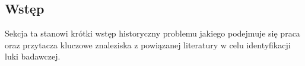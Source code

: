 \subsection{Wstęp}

Sekcja ta stanowi krótki wstęp historyczny problemu jakiego podejmuje się praca oraz przytacza kluczowe znaleziska z powiązanej literatury w celu identyfikacji luki badawczej. 
